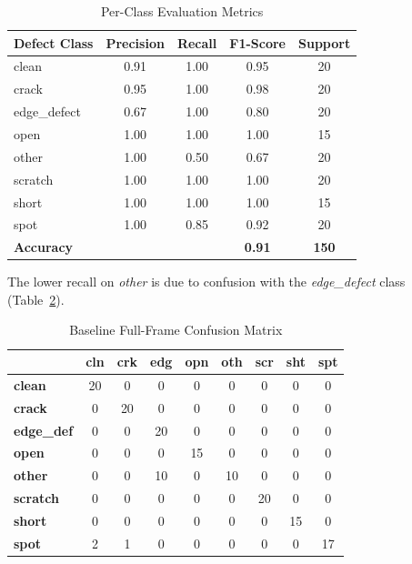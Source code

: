 \documentclass[conference]{IEEEtran}
\begin{document}
\begin{table}[h]
\centering
\caption{Per-Class Evaluation Metrics}
\label{tab:classification_performance}
\setlength{\tabcolsep}{6pt}
\footnotesize
\begin{tabular}{lcccc}
\toprule
\textbf{Defect Class} & \textbf{Precision} & \textbf{Recall} & \textbf{F1-Score} & \textbf{Support} \\
\midrule
clean & 0.91 & 1.00 & 0.95 & 20 \\
crack & 0.95 & 1.00 & 0.98 & 20 \\
edge\_defect & 0.67 & 1.00 & 0.80 & 20 \\
open & 1.00 & 1.00 & 1.00 & 15 \\
other & 1.00 & 0.50 & 0.67 & 20 \\
scratch & 1.00 & 1.00 & 1.00 & 20 \\
short & 1.00 & 1.00 & 1.00 & 15 \\
spot & 1.00 & 0.85 & 0.92 & 20 \\
\midrule
\textbf{Accuracy} & & & \textbf{0.91} & \textbf{150} \\
\bottomrule
\end{tabular}
\end{table}

The lower recall on \textit{other} is due to confusion with the \textit{edge\_defect} class (Table~\ref{tab:confusion_matrix}).

\begin{table}[h]
\centering
\caption{Baseline Full-Frame Confusion Matrix}
\label{tab:confusion_matrix}
\setlength{\tabcolsep}{3pt}
\footnotesize
\begin{tabular}{lcccccccc}
\toprule
 & \textbf{cln} & \textbf{crk} & \textbf{edg} & \textbf{opn} & \textbf{oth} & \textbf{scr} & \textbf{sht} & \textbf{spt} \\
\midrule
\textbf{clean}       & 20 & 0 & 0 & 0 & 0 & 0 & 0 & 0 \\
\textbf{crack}       & 0 & 20 & 0 & 0 & 0 & 0 & 0 & 0 \\
\textbf{edge\_def}   & 0 & 0 & 20 & 0 & 0 & 0 & 0 & 0 \\
\textbf{open}        & 0 & 0 & 0 & 15 & 0 & 0 & 0 & 0 \\
\textbf{other}       & 0 & 0 & 10 & 0 & 10 & 0 & 0 & 0 \\
\textbf{scratch}     & 0 & 0 & 0 & 0 & 0 & 20 & 0 & 0 \\
\textbf{short}       & 0 & 0 & 0 & 0 & 0 & 0 & 15 & 0 \\
\textbf{spot}        & 2 & 1 & 0 & 0 & 0 & 0 & 0 & 17 \\
\bottomrule
\end{tabular}
\end{table}
\end{document}
